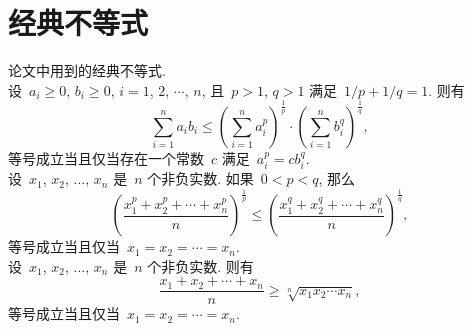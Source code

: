 \chapter{经典不等式}
论文中用到的经典不等式.\\

设~$a_i\geq0$, $b_i\geq0$, $i=1$, $2$, $\cdots$, $n$, 且~$p>1$, $q>1$ 
满足~$1/p+1/q=1$. 则有
\[
\sum_{i=1}^{n}a_ib_i\leq\left(\sum_{i=1}^{n}a_i^p\right)^{\frac1p}
\cdot\left(\sum_{i=1}^{n}b_i^q\right)^{\frac1q},
\]
等号成立当且仅当存在一个常数~$c$ 满足~$a_i^p=cb_i^q$.\\

设~$x_1$, $x_2$, $\ldots$, $x_n$ 是~$n$ 个非负实数. 如果~$0<p<q$, 那么
\[
\left(\frac{x_1^p+x_2^p+\cdots+x_n^p}{n}\right)^{\frac{1}{p}}\leq
\left(\frac{x_1^q+x_2^q+\cdots+x_n^q}{n}\right)^{\frac{1}{q}},
\]
等号成立当且仅当~$x_1=x_2=\cdots =x_n$.\\

设~$x_1$, $x_2$, $\ldots$, $x_n$ 是~$n$ 个非负实数. 则有
\[
\frac{x_1+x_2+\cdots+x_n}{n}\geq\sqrt[n]{x_1x_2\cdots x_n},
\]
等号成立当且仅当~$x_1=x_2=\cdots =x_n$.